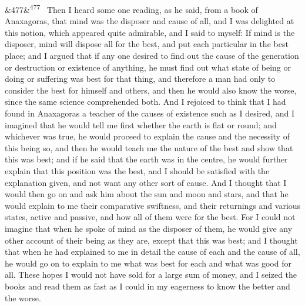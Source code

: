 \documentclass[12pt]{article}
\newcommand{\para}[1][]{\par\noindent\ifx&#1&\else\textsuperscript{\footnotesize #1}~\fi}
\begin{document}
\para[477] Then I heard some one reading, as he said, from a book of Anaxagoras, that mind was the disposer and cause of all, and I was delighted at this notion, which appeared quite admirable, and I said to myself: If mind is the disposer, mind will dispose all for the best, and put each particular in the best place; and I argued that if any one desired to find out the cause of the generation or destruction or existence of anything, he must find out what state of being or doing or suffering was best for that thing, and therefore a man had only to consider the best for himself and others, and then he would also know the worse, since the same science comprehended both. And I rejoiced to think that I had found in Anaxagoras a teacher of the causes of existence such as I desired, and I imagined that he would tell me first whether the earth is flat or round; and whichever was true, he would proceed to explain the cause and the necessity of this being so, and then he would teach me the nature of the best and show that this was best; and if he said that the earth was in the centre, he would further explain that this position was the best, and I should be satisfied with the explanation given, and not want any other sort of cause. And I thought that I would then go on and ask him about the sun and moon and stars, and that he would explain to me their comparative swiftness, and their returnings and various states, active and passive, and how all of them were for the best. For I could not imagine that when he spoke of mind as the disposer of them, he would give any other account of their being as they are, except that this was best; and I thought that when he had explained to me in detail the cause of each and the cause of all, he would go on to explain to me what was best for each and what was good for all. These hopes I would not have sold for a large sum of money, and I seized the books and read them as fast as I could in my eagerness to know the better and the worse.
\end{document}
